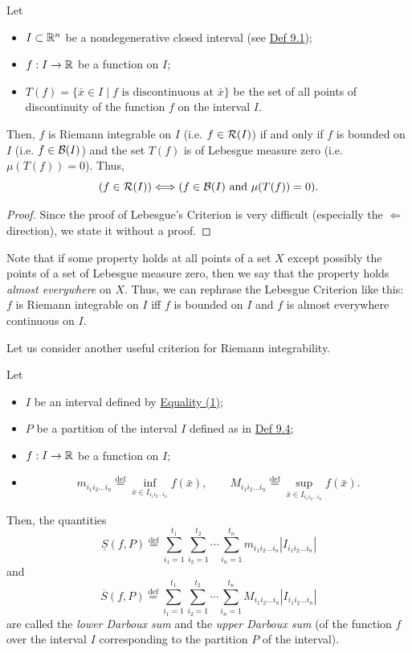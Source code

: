 \begin{claim}\label{claim:9.2}
Let
\begin{itemize}
    \item $I\subset\mathbb{R}^n$ be a nondegenerative closed interval (see \hyperref[def:9.1]{Def 9.1});
    \item $f:I\to\mathbb{R}$ be a function on $I$;
    \item $T(f)=\{\bar x\in I\mid f\text{ is discontinuous at }\bar x\}$ be the set of all points of discontinuity of the function $f$ on the interval $I$.
\end{itemize}
Then, $f$ is Riemann integrable on $I$ (i.e. $f\in\mathcal{R}(I)$) if and only if $f$ is bounded on $I$ (i.e. $f\in\mathcal{B}(I)$) and the set $T(f)$ is of Lebesgue measure zero (i.e. $\mu(T(f))=0$).
Thus,
\[
(f\in\mathcal{R}(I))\Longleftrightarrow(f\in\mathcal{B}(I)\text{ and }\mu(T(f))=0).
\]
\end{claim}

\begin{proof}
Since the proof of Lebesgue's Criterion is very difficult (especially the $\Leftarrow$ direction), we state it without a proof.
\end{proof}

Note that if some property holds at all points of a set $X$ except possibly the points of a set of Lebesgue measure zero, then we say that the property holds \emph{almost everywhere} on $X$. Thus, we can rephrase the Lebesgue Criterion like this: $f$ is Riemann integrable on $I$ iff $f$ is bounded on $I$ and $f$ is almost everywhere continuous on $I$.

Let us consider another useful criterion for Riemann integrability.

\begin{definition}\label{def:9.11}
Let
\begin{itemize}
    \item $I$ be an interval defined by \hyperref[eq:9:1:1]{Equality (1)};
    \item $P$ be a partition of the interval $I$ defined as in \hyperref[def:9.4]{Def 9.4};
    \item $f:I\to\mathbb{R}$ be a function on $I$;
    \item
    \[
    m_{i_1i_2\ldots i_n}\overset{\mathrm{def}}{=}\inf_{\bar x\in I_{i_1i_2\ldots i_n}}f(\bar x),
    \qquad
    M_{i_1i_2\ldots i_n}\overset{\mathrm{def}}{=}\sup_{\bar x\in I_{i_1i_2\ldots i_n}}f(\bar x).
    \]
\end{itemize}
Then, the quantities
\[
\underline{S}(f,P)\overset{\mathrm{def}}{=}
\sum_{i_1=1}^{t_1}\sum_{i_2=1}^{t_2}\cdots\sum_{i_n=1}^{t_n}
m_{i_1i_2\ldots i_n}|I_{i_1i_2\ldots i_n}|
\]
and
\[
\overline{S}(f,P)\overset{\mathrm{def}}{=}
\sum_{i_1=1}^{t_1}\sum_{i_2=1}^{t_2}\cdots\sum_{i_n=1}^{t_n}
M_{i_1i_2\ldots i_n}|I_{i_1i_2\ldots i_n}|
\]
are called the \emph{lower Darboux sum} and the \emph{upper Darboux sum} (of the function $f$ over the interval $I$ corresponding to the partition $P$ of the interval).
\end{definition}

